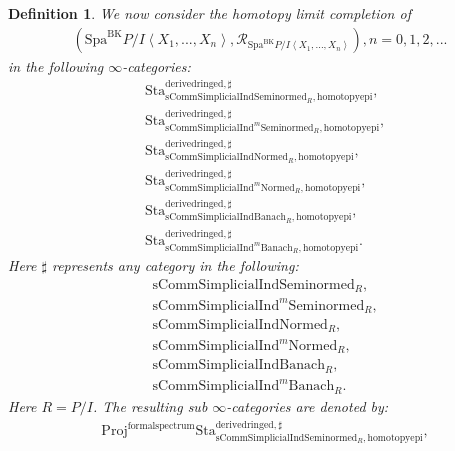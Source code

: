\documentclass[12pt]{book}
\newtheorem{definition}{Definition}
\begin{document}
\begin{definition}
We now consider the homotopy limit completion of 
\begin{align}
(\mathrm{Spa}^\mathrm{BK}P/I\left<X_1,...,X_n\right>,\mathcal{R}_{\mathrm{Spa}^\mathrm{BK}P/I\left<X_1,...,X_n\right>}),n=0,1,2,...
\end{align}
in the following $\infty$-categories:
\begin{align}
&\mathrm{Sta}^\mathrm{derivedringed,\sharp}_{\mathrm{sComm}\mathrm{Simplicial}\mathrm{Ind}\mathrm{Seminormed}_R,\mathrm{homotopyepi}},\\
&\mathrm{Sta}^\mathrm{derivedringed,\sharp}_{\mathrm{sComm}\mathrm{Simplicial}\mathrm{Ind}^m\mathrm{Seminormed}_R,\mathrm{homotopyepi}},\\
&\mathrm{Sta}^\mathrm{derivedringed,\sharp}_{\mathrm{sComm}\mathrm{Simplicial}\mathrm{Ind}\mathrm{Normed}_R,\mathrm{homotopyepi}},\\
&\mathrm{Sta}^\mathrm{derivedringed,\sharp}_{\mathrm{sComm}\mathrm{Simplicial}\mathrm{Ind}^m\mathrm{Normed}_R,\mathrm{homotopyepi}},\\
&\mathrm{Sta}^\mathrm{derivedringed,\sharp}_{\mathrm{sComm}\mathrm{Simplicial}\mathrm{Ind}\mathrm{Banach}_R,\mathrm{homotopyepi}},\\
&\mathrm{Sta}^\mathrm{derivedringed,\sharp}_{\mathrm{sComm}\mathrm{Simplicial}\mathrm{Ind}^m\mathrm{Banach}_R,\mathrm{homotopyepi}}.	
\end{align}
Here $\sharp$ represents any category in the following:
\begin{align}
&\mathrm{sComm}\mathrm{Simplicial}\mathrm{Ind}\mathrm{Seminormed}_R,\\
&\mathrm{sComm}\mathrm{Simplicial}\mathrm{Ind}^m\mathrm{Seminormed}_R,\\
&\mathrm{sComm}\mathrm{Simplicial}\mathrm{Ind}\mathrm{Normed}_R,\\
&\mathrm{sComm}\mathrm{Simplicial}\mathrm{Ind}^m\mathrm{Normed}_R,\\
&\mathrm{sComm}\mathrm{Simplicial}\mathrm{Ind}\mathrm{Banach}_R,\\
&\mathrm{sComm}\mathrm{Simplicial}\mathrm{Ind}^m\mathrm{Banach}_R.	
\end{align}	
Here $R=P/I$. The resulting sub $\infty$-categories are denoted by:
\begin{align}
&\mathrm{Proj}^\mathrm{formalspectrum}\mathrm{Sta}^\mathrm{derivedringed,\sharp}_{\mathrm{sComm}\mathrm{Simplicial}\mathrm{Ind}\mathrm{Seminormed}_R,\mathrm{homotopyepi}},\\

\end{align}
\end{definition}
\end{document}
